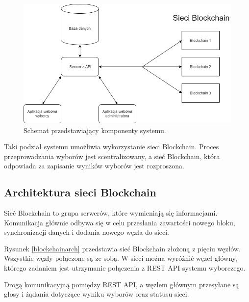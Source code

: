 \documentclass[a4paper,12pt]{book}
\begin{document}
\begin{figure}[H]
    	\centering
	\includegraphics[width=\textwidth]{images/modules.png}
	\caption{Schemat przedstawiający komponenty systemu.}\label{komponenty}
\end {figure}

Taki podział systemu umożliwia wykorzystanie sieci Blockchain. Proces przeprowadzania wyborów jest scentralizowany, a sieć Blockchain, która odpowiada za zapisanie wyników wyborów jest rozproszona.
 
\subsection{Architektura sieci Blockchain}
 
Sieć Blockchain to grupa serwerów, które wymieniają się informacjami. Komunikacja głównie odbywa się w celu przesłania zawartości nowego bloku, synchronizacji danych i dodania nowego węzła do sieci.

Rysunek \ref{blockchainarch} przedstawia sieć Blockchain złożoną z pięciu węzłów. Wszystkie węzły połączone są ze sobą. W sieci można wyróżnić węzeł główny, którego zadaniem jest utrzymanie połączenia z REST API systemu wyborczego.

Drogą komunikacyjną pomiędzy REST API, a węzłem głównym przesyłane są głosy i żądania dotyczące wyniku wyborów oraz statusu sieci.
\end{document}
